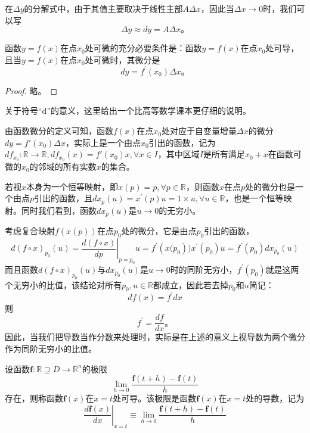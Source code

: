\documentclass[main.tex]{subfiles}
\begin{document}
在$\Delta y$的分解式中，由于其值主要取决于线性主部$A\Delta x$，因此当$\Delta x\to 0$时，我们可以写
\[
\Delta y\approx dy=A\Delta x\text{。}
\]

\begin{theorem}\cite[“定理2.5.1”,p.~103]{华工高数2009上}
函数$y=f\left(x\right)$在点$x_0$处可微的充分必要条件是：函数$y=f\left(x\right)$在点$x_0$处可导，且当$y=f\left(x\right)$在点$x_0$处可微时，其微分是
\[
dy=f^\prime\left(x_0\right)\Delta x\text{。}
\]
\end{theorem}
\begin{proof}
略\cite[p.~103]{华工高数2009上}。
\end{proof}

关于符号“d”的意义，这里给出一个比高等数学课本\cite[p.~104]{华工高数2009上}更仔细的说明。

由函数微分的定义可知，函数$f\left(x\right)$在点$x_0$处对应于自变量增量$\Delta x$的微分$dy=f'\left(x_0\right)\Delta x$，实际上是一个由点$x_0$引出的函数，记为$df_{x_0}:\mathbb{R}\rightarrow\mathbb{R},df_{x_0}\left(x\right)=f'\left(x_0\right)x,\forall x\in I$，其中区域$I$是所有满足$x_0+x$在函数可微的$x_0$的邻域的所有实数$x$的集合。

若视$x$本身为一个恒等映射，即$x\left(p\right)=p,\forall p\in\mathbb{R}$，则函数$x$在点$p$处的微分也是一个由点$p$引出的函数，且$dx_p\left(u\right)=x^\prime\left(p\right) u=1\times u,\forall u\in\mathbb{R}$，也是一个恒等映射。同时我们看到，函数$dx_p\left(u\right)$是$u\to 0$的无穷小。

考虑复合映射$f\left(x\left(p\right)\right)$在点$p_0$处的微分，它是由点$p_0$引出的函数，\[d\left(f\circ x\right)_{p_0}\left(u\right)=\left.\frac{d\left(f\circ x\right)}{dp}\right|_{p=p_0}u=f^\prime\left(x(p_0\right))x^\prime\left(p_0\right)u=f^\prime\left(p_0\right)dx_{p_0}\left(u\right)\]
而且函数$d\left(f\circ x\right)_{p_0}\left(u\right)$与$dx_{p_0}\left(u\right)$是$u\to 0$时的同阶无穷小，$f^\prime\left(p_0\right)$就是这两个无穷小的比值，该结论对所有$p_0,u\in\mathbb{R}$都成立，因此若去掉$p_0$和$u$简记：
\[df\left(x\right)=f^\prime dx\]
则
\[f^\prime=\frac{df}{dx}\text{。}\]
因此，当我们把导数当作分数来处理时，实际是在上述的意义上视导数为两个微分作为同阶无穷小的比值。

\begin{definition}[一元向量函数的导数]
设函数$\mathbf{f}:\mathbb{R}\supseteq D\rightarrow\mathbb{R}^n$的极限
\[
\lim_{h\to 0}\frac{\mathbf{f}\left(t+h\right)-\mathbf{f}\left(t\right)}{h}
\]
存在，则称函数$\mathbf{f}\left(x\right)$在$x=t$处可导。该极限是函数$\mathbf{f}\left(x\right)$在$x=t$处的导数，记为
\[
\left.\frac{d\mathbf{f}\left(x\right)}{dx}\right|_{x=t}\equiv\lim_{h\to 0}\frac{\mathbf{f}\left(t+h\right)-\mathbf{f}\left(t\right)}{h}
\]
\end{definition}
\end{document}
